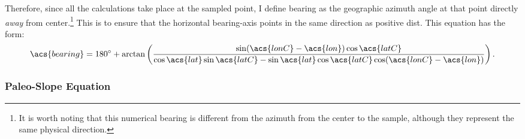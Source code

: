 Therefore, since all the calculations take place at the sampled point, I define \acs{bearing} as the geographic azimuth angle at that point directly \emph{away} from \acs{center}.\footnote{It is worth noting that this numerical bearing is different from the azimuth from the center to the sample, although they represent the same physical direction.} This is to ensure that the horizontal \acs{bearing}-axis points in the same direction as positive \acs{dist}. This equation \parencite{williams_aviation, veness_calculate} has the form:
\begin{equation}
    \acs{bearing} = \ang{180} + \arctan\left(\frac{\sin(\acs{lonC}-\acs{lon})\cos\acs{latC}} {\cos\acs{lat} \sin\acs{latC}-\sin\acs{lat}\cos\acs{latC}\cos(\acs{lonC}-\acs{lon})}\right).
\end{equation} 

\subsubsection{Paleo-Slope Equation}\label{sec:paleo-slope}

